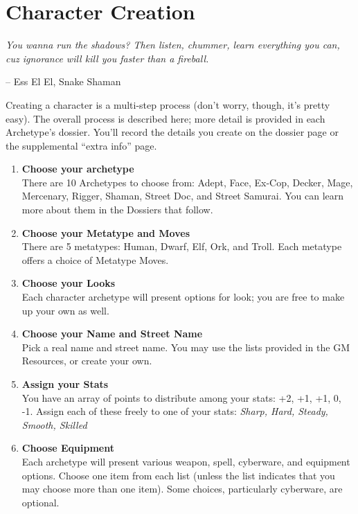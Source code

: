 \chapter{Character Creation}

\epigraph{\textit{You wanna run the shadows? Then listen, chummer, learn everything you can, cuz ignorance will kill you faster than a fireball.}}{-- Ess El El, Snake Shaman}

Creating a character is a multi-step process (don’t worry, though, it’s pretty easy). The overall process is described here; more detail is provided in each Archetype’s dossier. You’ll record the details you create on the dossier page or the supplemental “extra info” page.

\begin{enumerate}
    \item \textbf{Choose your archetype} \\
    There are 10 Archetypes to choose from: Adept, Face, Ex-Cop, Decker, Mage, Mercenary, Rigger, Shaman, Street Doc, and Street Samurai. You can learn more about them in the Dossiers that follow.
    
    \item \textbf{Choose your Metatype and Moves} \\
    There are 5 metatypes: Human, Dwarf, Elf, Ork, and Troll. Each metatype offers a choice of Metatype Moves.
    
    \item \textbf{Choose your Looks} \\
    Each character archetype will present options for look; you are free to make up your own as well.
    
    \item \textbf{Choose your Name and Street Name} \\
    Pick a real name and street name. You may use the lists provided in the GM Resources, or create your own.
    
    \item \textbf{Assign your Stats} \\
    You have an array of points to distribute among your stats: +2, +1, +1, 0, -1. Assign each of these freely to one of your \refname{stats}: \textit{Sharp, Hard, Steady, Smooth, Skilled}
    
    \item \textbf{Choose Equipment} \\
    Each archetype will present various weapon, spell, cyberware, and equipment options. Choose one item from each list (unless the list indicates that you may choose more than one item). Some choices, particularly cyberware, are optional.
    

\end{enumerate}
